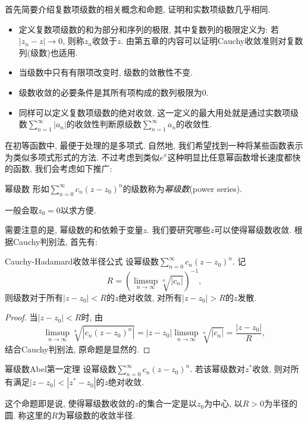 首先简要介绍复数项级数的相关概念和命题, 证明和实数项级数几乎相同. 
\begin{itemize}
	\item 定义复数项级数的和为部分和序列的极限, 其中复数列的极限定义为: 若$|z_n-z| \to 0$, 则称$z_n$收敛于$z$. 由第五章的内容可以证明Cauchy收敛准则对复数列(级数)也适用. 
	\item 当级数中只有有限项改变时, 级数的敛散性不变. 
	\item 级数收敛的必要条件是其所有项构成的数列极限为$0$. 
	\item 同样可以定义复数项级数的绝对收敛, 这一定义的最大用处就是通过实数项级数$\sum_{n=1}^{\infty} |a_n|$的收敛性判断原级数$\sum_{n=1}^{\infty} a_n$的收敛性. 
\end{itemize}

在初等函数中, 最便于处理的是多项式. 自然地, 我们希望找到一种将某些函数表示为类似多项式形式的方法. 不过考虑到类似$e^x$这种明显比任意幂函数增长速度都快的函数, 我们会考虑如下推广: 

\begin{definition}{幂级数}
	形如$\sum_{n=0}^{\infty} c_n(z-z_0)^n$的级数称为\textit{幂级数}(power series). 
\end{definition}
\begin{remark}
	一般会取$z_0=0$以求方便. 
\end{remark}

需要注意的是, 幂级数的和依赖于变量$z$. 我们要研究哪些$z$可以使得幂级数收敛. 根据Cauchy判别法, 首先有: 

\begin{theorem}{Cauchy-Hadamard收敛半径公式}
	设幂级数$\sum_{n=0}^{\infty} c_n(z-z_0)^n$. 记$$R = \left( \limsup_{n\to \infty} \sqrt[n]{|c_n|} \right)^{-1}, $$
	则级数对于所有$|z-z_0|<R$的$z$绝对收敛, 对所有$|z-z_0|>R$的$z$发散. 
\end{theorem}
\begin{proof}
	当$|z-z_0|<R$时, 由$$\limsup_{n\to \infty} \sqrt[n]{|c_n(z-z_0)^n|} = |z-z_0| \limsup_{n\to \infty} \sqrt[n]{|c_n|} = \frac{|z-z_0|}{R}, $$
	结合Cauchy判别法, 原命题是显然的. 
\end{proof}

\begin{corollary}{幂级数Abel第一定理}
	设幂级数$\sum_{n=0}^{\infty} c_n(z-z_0)^n$. 若该幂级数对$z^*$收敛, 则对所有满足$|z-z_0|<|z^*-z_0|$的$z$绝对收敛. 
\end{corollary}
\begin{remark}
	这个命题即是说, 使得幂级数收敛的$z$的集合一定是以$z_0$为中心, 以$R>0$为半径的圆. 称这里的$R$为幂级数的收敛半径. 
\end{remark}


